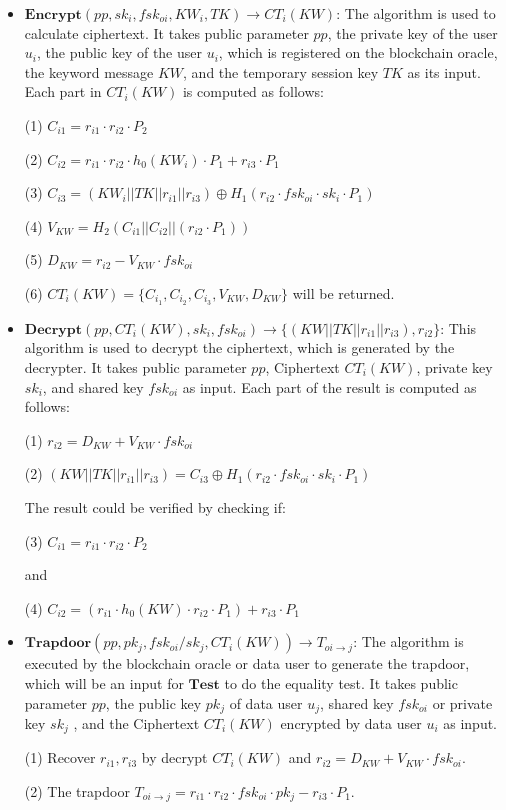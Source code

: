 \documentclass[journal]{IEEEtran}
\begin{document}
\begin{itemize}
    \item $ \boldsymbol{Encrypt}(pp, sk_i, fsk_{oi}, KW_i, TK) \to CT_i(KW) $: The algorithm is used to calculate ciphertext. It takes public parameter $pp$, the private key of the user $u_i$, the public key of the user $u_i$, which is registered on the blockchain oracle, the keyword message $KW$, and the temporary session key $TK$ as its input. Each part in $CT_i(KW)$ is computed as follows: 
    
    (1) $C_{i1} = r_{i1} \cdot r_{i2} \cdot P_2$
    
    (2) $C_{i2} = r_{i1} \cdot r_{i2} \cdot h_0(KW_i) \cdot P_1 + r_{i3} \cdot P_1$ 
    
    (3) $C_{i3} = (KW_i||TK||r_{i1}||r_{i3}) \oplus H_1(r_{i2} \cdot fsk_{oi} \cdot sk_i \cdot P_1)$
    
    (4) $V_{KW} = H_2(C_{i1}||C_{i2}||(r_{i2} \cdot P_1))$
    
    (5) $D_{KW} = r_{i2}-V_{KW} \cdot fsk_{oi}$
    
    (6) $CT_i(KW) = \{C_{i_1}, C_{i_2}, C_{i_3}, V_{KW}, D_{KW}\}$ will be returned.
\end{itemize}

\begin{itemize}
    \item $ \boldsymbol{Decrypt}(pp, CT_i(KW), sk_{i}, fsk_{oi}) \to \{(KW||TK||r_{i1}||r_{i3}), r_{i2}\} $: This algorithm is used to decrypt the ciphertext, which is generated by the decrypter. It takes public parameter $pp$, Ciphertext $CT_i(KW)$, private key $sk_{i}$, and shared key $fsk_{oi}$ as input. Each part of the result is computed as follows: 
    
    (1) $r_{i2} = D_{KW} + V_{KW} \cdot fsk_{oi}$
    
    (2) $(KW||TK||r_{i1}||r_{i3}) = C_{i3} \oplus H_1(r_{i2} \cdot fsk_{oi} \cdot sk_i \cdot P_1)$
    
    The result could be verified by checking if: 
    
    (3) $C_{i1} = r_{i1} \cdot r_{i2} \cdot P_2$
    
    and 
    
    (4) $C_{i2} = (r_{i1} \cdot h_0(KW) \cdot r_{i2} \cdot P_1) + r_{i3} \cdot P_1$
    
    \item $ \boldsymbol{Trapdoor}(pp, pk_j, fsk_{oi}/sk_j, CT_i(KW)) \to T_{oi \to j} $: The algorithm is executed by the blockchain oracle or data user to generate the trapdoor, which will be an input for $\boldsymbol{Test}$ to do the equality test. It takes public parameter $pp$, the public key $pk_j$ of data user $u_j$, shared key $fsk_{oi}$ or private key $sk_j$ , and the Ciphertext $CT_i(KW)$ encrypted by data user $u_i$ as input.
    
    (1) Recover $r_{i1}, r_{i3}$ by decrypt $CT_i(KW)$ and $r_{i2} = D_{KW} + V_{KW} \cdot fsk_{oi}$. 
    
    (2) The trapdoor $T_{oi \to j} = r_{i1} \cdot r_{i2} \cdot fsk_{oi} \cdot pk_j - r_{i3} \cdot P_1$.
\end{itemize}
\end{document}
